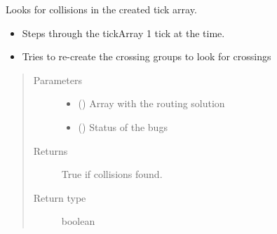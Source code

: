 \documentclass[letterpaper,10pt,english]{sphinxmanual}
\begin{document}
\begin{fulllineitems}
\label{\detokenize{reference:taipanPyRouter.checkForCollisions}}
Looks for collisions in the created tick array.
\begin{itemize}
\item {} 
Steps through the tickArray 1 tick at the time.

\item {} 
Tries to re-create the crossing groups to look for crossings

\end{itemize}
\begin{quote}\begin{description}
\item[{Parameters}] \leavevmode\begin{itemize}
\item {} 
 () \textendash{} Array with the routing solution

\item {} 
 () \textendash{} Status of the bugs

\end{itemize}

\item[{Returns}] \leavevmode
True if collisions found.

\item[{Return type}] \leavevmode
boolean

\end{description}\end{quote}

\end{fulllineitems}

\end{document}

